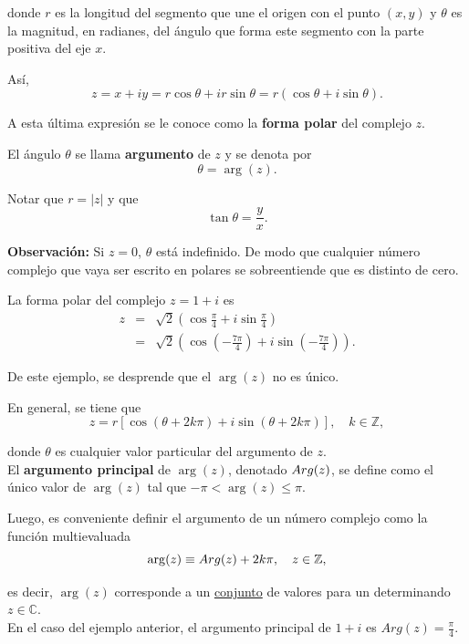 donde $r$ es la longitud del segmento que une el origen con el punto $(x,y)$ y $\theta$ es la magnitud, en radianes, del ángulo que forma este segmento con la parte positiva del eje $x$.

Así,
$$z = x+iy = r \cos \theta + ir \sin \theta = r (\cos \theta + i \sin\theta).$$

A esta última expresión se le conoce como la \textbf{forma polar} del complejo $z$. 

El ángulo $\theta$ se llama \textbf{argumento} de $z$ y se denota por
$$\theta = \arg(z).$$

Notar que $r = |z|$ y que 
$$\tan \theta = \frac{y}{x}.$$

\textbf{Observación:} Si $z = 0$, $\theta$ está indefinido. De modo que cualquier número complejo que vaya ser escrito en polares se sobreentiende que es distinto de cero.

\begin{ejemplo}
 La forma polar del complejo $z = 1+i$ es
\begin{eqnarray*}
z &=& \sqrt{2} \left( \cos \frac{\pi}{4} + i \sin \frac{\pi}{4} \right) \\
&=& \sqrt{2} \left( \cos \left( -\frac{7\pi}{4}\right) + i \sin \left( - \frac{7\pi}{4} \right) \right).
\end{eqnarray*} 
\end{ejemplo}

De este ejemplo, se desprende que el $\arg(z)$ no es único.

En general, se tiene que
$$z = r [\cos (\theta + 2k\pi) + i \sin(\theta + 2k\pi)], \quad k \in \mathbb{Z},$$

donde $\theta$ es cualquier valor particular del argumento  de $z$.
\\

El \textbf{argumento principal} de $\arg(z)$, denotado $Arg(z)$, se define como el único valor de $\arg(z)$ tal que $- \pi < \arg(z) \leq \pi$.

Luego, es conveniente definir el argumento de un número complejo como la función multievaluada
$$\arg(z) \equiv Arg(z) + 2k \pi, \quad z \in \mathbb{Z},$$

es decir, $\arg(z)$ corresponde a un \underline{conjunto} de valores para un determinando $z \in \mathbb{C}$.
\\

En el caso del ejemplo anterior, el argumento principal de $1+i$ es $Arg(z) = \frac{\pi}{4}$.
\\

